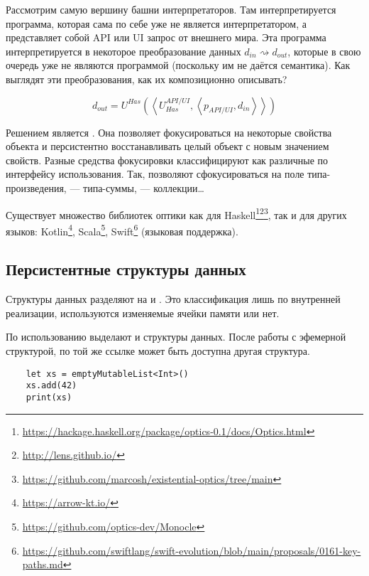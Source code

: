 
Рассмотрим самую вершину башни интерпретаторов.
Там интерпретируется программа, которая сама по себе уже не является интерпретатором, а представляет собой API или UI запрос от внешнего мира.
Эта программа интерпретируется в некоторое преобразование данных $d_{in}\rightsquigarrow d_{out}$, которые в свою очередь уже не являются программой (поскольку им не даётся семантика).
Как выглядят эти преобразования, как их композиционно описывать?

\[
    d_{out} =
    U^{Has}\left(
    \left<
    U_{Has}^{API/UI},
    \left<
    p_{API/UI},
    d_{in}
    \right>
    \right>
    \right)
\]

Решением является .
Она позволяет фокусироваться на некоторые свойства объекта и персистентно восстанавливать целый объект с новым значением свойств.
Разные средства фокусировки классифицируют как различные  по интерфейсу использования.
Так,  позволяют сфокусироваться на поле типа-произведения,  --- типа-суммы,  --- коллекции\ldots

Существует множество библиотек оптики как для Haskell\footnote{\url{https://hackage.haskell.org/package/optics-0.1/docs/Optics.html}}\footnote{\url{http://lens.github.io/}}\footnote{\url{https://github.com/marcosh/existential-optics/tree/main}}, так и для других языков: Kotlin\footnote{\url{https://arrow-kt.io/}}, Scala\footnote{\url{https://github.com/optics-dev/Monocle}}, Swift\footnote{\url{https://github.com/swiftlang/swift-evolution/blob/main/proposals/0161-key-paths.md}} (языковая поддержка).

\subsection{Персистентные структуры данных}

Структуры данных разделяют на  и .
Это классификация лишь по внутренней реализации, используются изменяемые ячейки памяти или нет.

По использованию выделают  и  структуры данных.
После работы с эфемерной структурой, по той же ссылке может быть доступна другая структура.
\begin{verbatim}
    let xs = emptyMutableList<Int>()
    xs.add(42)
    print(xs)
\end{verbatim}

